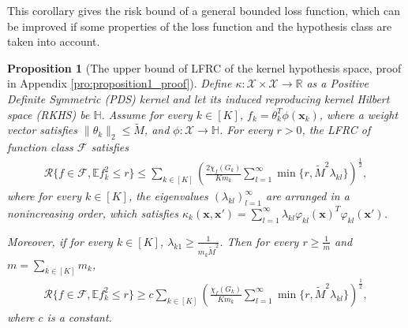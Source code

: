 \documentclass{article}
\def\sR{\mathbb{R}}
\def\vx{{\mathbf{x}}}
\def\eE{\mathbb{E}}
\newtheorem{proposition}{Proposition}
\begin{document}
This corollary gives the risk bound of a general bounded loss function, which can be improved if some properties of the loss function and the hypothesis class are taken into account. 
\begin{proposition}[The upper bound of LFRC of the kernel hypothesis space, proof in Appendix \ref{pro:proposition1_proof}] \label{thm:kernel upper bound}
Define $\kappa: \mathcal{X} \times \mathcal{X} \rightarrow \sR$ as a Positive Definite Symmetric (PDS) kernel and let its induced reproducing kernel Hilbert space (RKHS) be $\mathbb{H}$. Assume for every $k \in [K]$, $f_k = \theta_k^T \phi(\vx_k)$, where a weight vector satisfies $\|\theta_k\|_2 \leq \widetilde{M}$, and $\phi: \mathcal{X} \rightarrow \mathbb{H}$. 
For every $r >0$, the LFRC of function class $\mathcal{F}$ satisfies 
    \begin{align*}
        \mathcal{R}\{ f \in \mathcal{F}, \eE f_k^2 \leq r \}  
        \leq \sum _{k \in [K]} \left(\frac{2 \chi_f(G_k)}{K m_k} \sum _{l=1}^{\infty} \min \{ r, \widetilde{M}^2 \lambda_{kl} \} \right)^{\frac{1}{2}},
    \end{align*}
where for every $k \in [K]$, the eigenvalues $(\lambda _{kl})_{l=1} ^{\infty}$
are arranged in a nonincreasing order, which satisfies $\kappa_k (\vx,\vx') = \sum _{l =1} ^{\infty} \lambda_{kl} \varphi_{kl}(\vx)^T \varphi _{kl}(\vx') $. 

Moreover, if for every $k \in [K]$, $\lambda_{k 1} \geq \frac{1}{m_k \widetilde{M}^2}$. 
Then for every $r \geq \frac{1}{m}$ and $m=\sum_{k \in [K]} m_k$, 
\begin{align*}
    \mathcal{R}\{ f \in \mathcal{F}, \eE f_k^2 \leq r \}  
    \geq c \sum _{k \in [K]} \left(\frac{ \chi_f(G_k)}{K m_k} \sum _{l=1}^{\infty} \min \{ r, \widetilde{M}^2 \lambda_{kl} \}\right)^{\frac{1}{2}},
\end{align*}
where $c$ is a constant. 
\end{proposition}
\end{document}
